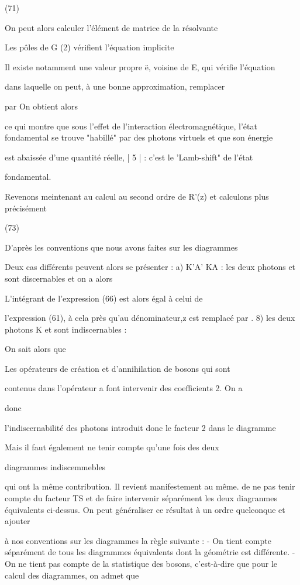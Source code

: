 (71)

On peut alors calculer l'élément de matrice de la résolvante

Les pôles de G (2) vérifient l'équation implicite

Il existe notamment une valeur propre ë, voisine de E, qui vérifie l'équation

dans laquelle on peut, à une bonne approximation, remplacer

par
On obtient alors

ce qui montre que sous l'effet de l'interaction électromagnétique, l'état
fondamental se trouve "habillé" par des photons virtuels et que son énergie

est abaissée d'une quantité réelle, | 5 | : c'est le 'Lamb-shift" de l'état

fondamental.

Revenons meintenant au calcul au second ordre de R'(z) et calculons plus précisément 

(73)

D'après les conventions que nous avons faites sur les diagrammes

Deux cas différents peuvent alors se présenter :
a) K'A'  KA : les deux photons et  sont discernables et on a alors

L'intégrant de l'expression (66) est alors égal à celui de

l'expression (61), à cela près qu'au dénominateur,z est remplacé par .
8)  les deux photons K et  sont indiscernables :

On sait alors que

Les opérateurs de création et d’annihilation de bosons qui sont

contenus dans l'opérateur a font intervenir des coefficients  2. On a

donc

l'indiscernabilité des photons introduit donc le facteur 2 dans le diagramme

Mais il faut également ne tenir compte qu'une fois des deux

diagrammes indiscemmebles

qui ont la même contribution. Il revient manifestement au même. de ne pas
tenir compte du facteur TS et de faire intervenir séparément les deux diagranmes équivalents ci-dessus.
On peut généraliser ce résultat à un ordre quelconque et ajouter

à nos conventions sur les diagrammes la règle suivante :
- On tient compte séparément de tous les diagrammes équivalents dont la géométrie est différente.
- On ne tient pas compte de la statistique des bosons, c'est-à-dire que pour
le calcul des diagrammes, on admet que

